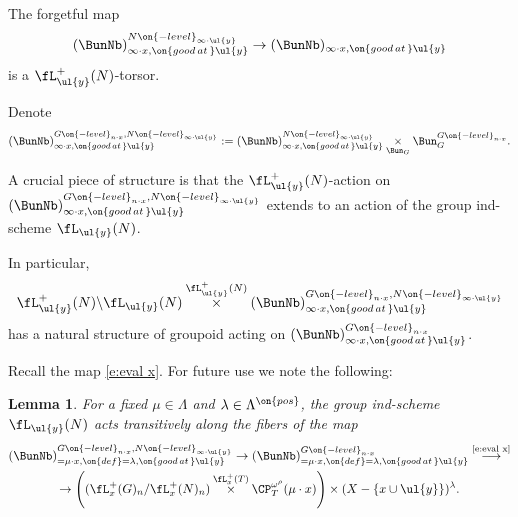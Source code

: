 \documentclass[9pt]{amsart}
\newtheorem{lem}[subsubsection]{Lemma}
\theoremstyle{definition}
\theoremstyle{remark}
\numberwithin{equation}{section}
\begin{document}
\medskip

The forgetful map
$$(\BunNb)^{N\on{-level}_{\infty\cdot \ul{y}}}_{\infty\cdot x,\on{good\,at\,}\ul{y}}\to
(\BunNb)_{\infty\cdot x,\on{good\,at\,}\ul{y}}$$
is a $\fL^+_{\ul{y}}(N)$-torsor. 

\medskip



\sssec{}  \label{sss:extend to loop group}

Denote
$$(\BunNb)^{G\on{-level}_{n\cdot x},N\on{-level}_{\infty\cdot \ul{y}}}_{\infty\cdot x,\on{good\,at\,}\ul{y}}:=
(\BunNb)^{N\on{-level}_{\infty\cdot \ul{y}}}_{\infty\cdot x,\on{good\,at\,}\ul{y}} 
\underset{\Bun_G}\times \Bun_G^{G\on{-level}_{n\cdot x}}.$$

\medskip

A crucial piece of structure is that the $\fL^+_{\ul{y}}(N)$-action on 
$(\BunNb)^{G\on{-level}_{n\cdot x},N\on{-level}_{\infty\cdot \ul{y}}}_{\infty\cdot x,\on{good\,at\,}\ul{y}}$
extends to an action of the group ind-scheme $\fL_{\ul{y}}(N)$.

\medskip

In particular, 
\begin{equation} \label{e:groupoid}
\fL^+_{\ul{y}}(N)\backslash \fL_{\ul{y}}(N)\overset{\fL^+_{\ul{y}}(N)}\times 
(\BunNb)^{G\on{-level}_{n\cdot x},N\on{-level}_{\infty\cdot \ul{y}}}_{\infty\cdot x,\on{good\,at\,}\ul{y}}
\end{equation}
has a natural structure of groupoid acting on $(\BunNb)^{G\on{-level}_{n\cdot x}}_{\infty\cdot x,\on{good\,at\,}\ul{y}}$. 

\sssec{}

Recall the map \eqref{e:eval x}. For future use we note the following:

\begin{lem}   \label{l:skinny strata} 
For a fixed $\mu\in \Lambda$ and $\lambda\in \Lambda^{\on{pos}}$, the group ind-scheme $\fL_{\ul{y}}(N)$
acts transitively along the fibers of the map
\begin{multline*}
(\BunNb)^{G\on{-level}_{n\cdot x},N\on{-level}_{\infty\cdot \ul{y}}}_{=\mu\cdot x,\on{def}=\lambda,\on{good\,at\,}\ul{y}}\to 
(\BunNb)^{G\on{-level}_{n\cdot x}}_{=\mu\cdot x,\on{def}=\lambda,\on{good\,at\,}\ul{y}}\overset{\text{\eqref{e:eval x}}}\longrightarrow \\
\to \left((\fL^+_x(G)_n/\fL^+_x(N)_n)\overset{\fL^+_x(T)}\times \CP^{\omega^\rho}_T(\mu\cdot x)\right)
\times (X-\{x\cup \ul{y}\})^\lambda.
\end{multline*}
\end{lem}
\end{document}
